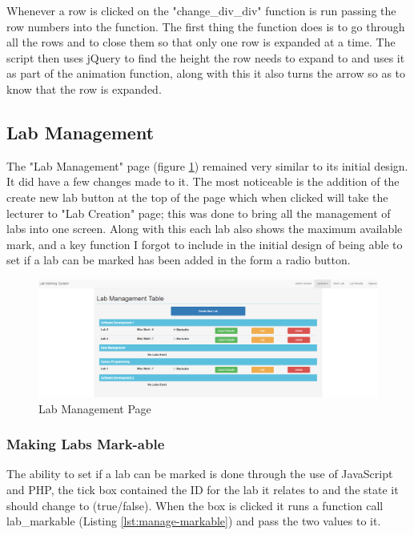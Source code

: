 \documentclass[12pt]{article}  %
\begin{document}
\noindent Whenever a row is clicked on the "change\_div\_div" function is run passing the row numbers into the function. The first thing the function does is to go through all the rows and to close them so that only one row is expanded at a time. The script then uses jQuery to find the height the row needs to expand to and uses it as part of the animation function, along with this it also turns the arrow so as to know that the row is expanded.








\subsection{Lab Management}

The "Lab Management" page (figure \ref{fig:lab-management}) remained very similar to its initial design. It did have a few changes made to it. The most noticeable is the addition of the create new lab button at the top of the page which when clicked will take the lecturer to "Lab Creation" page; this was done  to bring all the management of labs into one screen. Along with this each lab also shows the maximum available mark, and a key function I forgot to include in the initial design of being able to set if a lab can be marked has been added in the form a radio button.

\begin{figure}[H]
    \centering
    \includegraphics[width=1\textwidth]{images/implementation/lab-management-page.png}
    \caption{Lab Management Page}
    \label{fig:lab-management}
\end{figure}


\subsubsection{Making Labs Mark-able}

The ability to set if a lab can be marked is done through the use of JavaScript and PHP, the tick box contained the ID for the lab it relates to and the state it should change to (true/false). When the box is clicked it runs a function call lab\_markable (Listing \ref{lst:manage-markable}) and pass the two values to it. 
\end{document}
